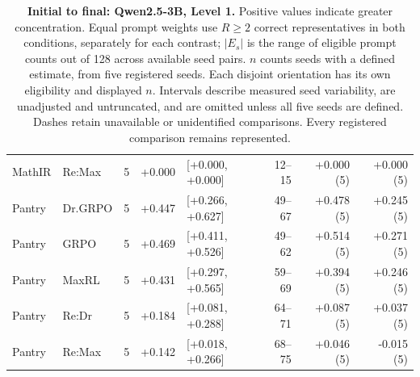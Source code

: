 \begin{table}[!htbp]
\begin{tabular}{@{}llcrlrrr@{}}
MathIR & Re:Max & 5 & +0.000 & [+0.000, +0.000] & 12--15 & +0.000 (5) & +0.000 (5) \\
Pantry & Dr.GRPO & 5 & +0.447 & [+0.266, +0.627] & 49--67 & +0.478 (5) & +0.245 (5) \\
Pantry & GRPO & 5 & +0.469 & [+0.411, +0.526] & 49--62 & +0.514 (5) & +0.271 (5) \\
Pantry & MaxRL & 5 & +0.431 & [+0.297, +0.565] & 59--69 & +0.394 (5) & +0.246 (5) \\
Pantry & Re:Dr & 5 & +0.184 & [+0.081, +0.288] & 64--71 & +0.087 (5) & +0.037 (5) \\
Pantry & Re:Max & 5 & +0.142 & [+0.018, +0.266] & 68--75 & +0.046 (5) & -0.015 (5) \\
\bottomrule
\end{tabular}
\caption{\textbf{Initial to final: Qwen2.5-3B, Level 1.} Positive values indicate greater concentration. Equal prompt weights use $R\ge2$ correct representatives in both conditions, separately for each contrast; $|E_s|$ is the range of eligible prompt counts out of 128 across available seed pairs. $n$ counts seeds with a defined estimate, from five registered seeds. Each disjoint orientation has its own eligibility and displayed $n$. Intervals describe measured seed variability, are unadjusted and untruncated, and are omitted unless all five seeds are defined. Dashes retain unavailable or unidentified comparisons. Every registered comparison remains represented.}
\end{table}

